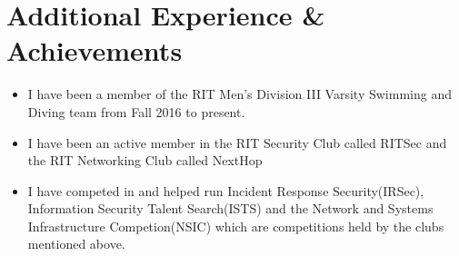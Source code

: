 \documentclass[letterpaper,11pt]{article}
\newcommand{\resumeSubHeadingListStart}{\begin{itemize}[leftmargin=*]}
\newcommand{\resumeSubHeadingListEnd}{\end{itemize}}
\newcommand{\shorterSection}[1]{\vspace{-10pt}\section{#1}}
\begin{document}
\shorterSection{Additional Experience \& Achievements}
  \resumeSubHeadingListStart
  \small
    \item{I have been a member of the RIT Men's Division III Varsity Swimming and Diving team from Fall 2016 to present.}
    \vspace{-5pt}
    \item{I have been an active member in the RIT Security Club called RITSec and the RIT Networking Club called NextHop}
    \vspace{-5pt}
    \item{I have competed in and helped run Incident Response Security(IRSec), Information Security Talent Search(ISTS) and the Network and Systems Infrastructure Competion(NSIC) which are competitions held by the clubs mentioned above.}
  \resumeSubHeadingListEnd
\end{document}
